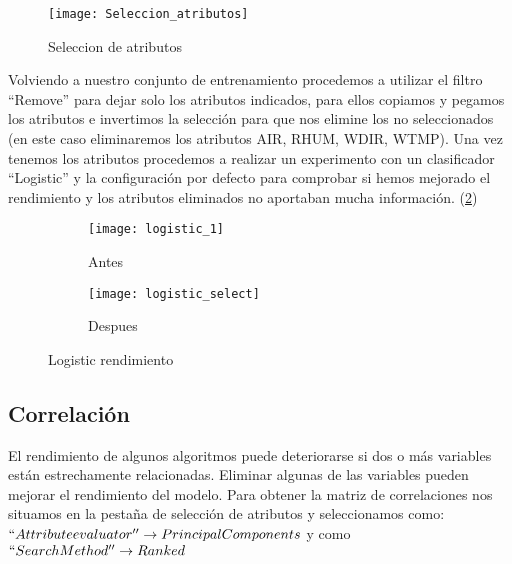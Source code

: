 \begin{figure}[H]
	\centering
	\texttt{[image: Seleccion\_atributos]}
    \caption{Seleccion de atributos}
    \label{fig:Seleccion_atributos}
\end{figure}

Volviendo a nuestro conjunto de entrenamiento procedemos a utilizar el filtro ``Remove'' para dejar solo los atributos indicados, para ellos copiamos y pegamos los atributos e invertimos la selección para que nos elimine los no seleccionados (en este caso eliminaremos los atributos AIR, RHUM, WDIR, WTMP). Una vez tenemos los atributos procedemos a realizar un experimento con un clasificador ``Logistic'' y la configuración por defecto para comprobar si hemos mejorado el rendimiento y los atributos eliminados no aportaban mucha información. (\ref{fig:Logistic_rendimiento})

\begin{figure}[H]
	\begin{subfigure}[H]{\textwidth}
    	\texttt{[image: logistic\_1]}	
    	\caption{Antes}
	\end{subfigure}
	\hfill
	\begin{subfigure}[H]{\textwidth}
    	\texttt{[image: logistic\_select]}	
    	\caption{Despues}
   
	\end{subfigure}
	\caption{Logistic rendimiento}
	\label{fig:Logistic_rendimiento}
\end{figure}

\subsection{Correlación}

El rendimiento de algunos algoritmos puede deteriorarse si dos o más variables están estrechamente relacionadas. Eliminar algunas de las variables pueden mejorar el rendimiento del modelo.
Para obtener la matriz de correlaciones nos situamos en la pestaña de selección de atributos y seleccionamos como: $ ``Attribute evaluator'' \rightarrow PrincipalComponents$ y como $ ``Search Method'' \rightarrow Ranked $


